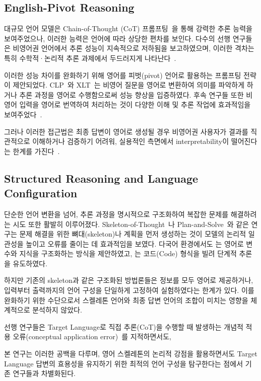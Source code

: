 \subsection{English-Pivot Reasoning}
대규모 언어 모델은 Chain-of-Thought (CoT) 프롬프팅~\citep{cot-neurips2022}을 통해 강력한 추론 능력을 보여주었으나, 이러한 능력은 언어에 따라 상당한 편차를 보인다. 다수의 선행 연구들은 비영어권 언어에서 추론 성능이 지속적으로 저하됨을 보고하였으며, 이러한 격차는 특히 수학적·논리적 추론 과제에서 두드러지게 나타난다~\citep{shi2022language, mega-emnlp2023, wang2025polymath}.

이러한 성능 차이를 완화하기 위해 영어를 피벗(pivot) 언어로 활용하는 프롬프팅 전략이 제안되었다. CLP~\citep{clp-emnlp2023}와 XLT~\citep{xlt-emnlp2023}는 비영어 질문을 영어로 변환하여 의미를 파악하게 하거나 추론 과정을 영어로 수행함으로써 성능 향상을 입증하였다. 후속 연구들 또한 비영어 입력을 영어로 번역하여 처리하는 것이 다양한 이해 및 추론 작업에 효과적임을 보여주었다~\citep{trans-allneed-2025naacl}.

그러나 이러한 접근법은 최종 답변이 영어로 생성될 경우 비영어권 사용자가 결과를 직관적으로 이해하거나 검증하기 어려워, 실용적인 측면에서 interpretability이 떨어진다는 한계를 가진다~\citep{multilingual-prompting-emnlp2025}.

\subsection{Structured Reasoning and Language Configuration} 
단순한 언어 변환을 넘어, 추론 과정을 명시적으로 구조화하여 복잡한 문제를 해결하려는 시도 또한 활발히 이루어졌다. Skeleton-of-Thought~\citep{ning2023skeleton}나 Plan-and-Solve~\citep{wang2023plan}와 같은 연구는 문제 해결을 위한 뼈대(skeleton)나 계획을 먼저 생성하는 것이 모델의 논리적 일관성을 높이고 오류를 줄이는 데 효과적임을 보였다. 다국어 환경에서도 \citet{qi2025sot}는 영어로 변수와 지식을 구조화하는 방식을 제안하였고, \citet{li2024eliciting}는 코드(Code) 형식을 빌려 단계적 추론을 유도하였다.

하지만 기존의 skeleton과 같은 구조화된 방법론들은 정보를 모두 영어로 제공하거나, 입력부터 출력까지의 언어 구성을 단일하게 고정하여 실험하였다는 한계가 있다. 이를 완화하기 위한 수단으로서 스켈레톤 언어와 최종 답변 언어의 조합이 미치는 영향을 체계적으로 분석하지 않았다.

선행 연구들은 Target Language로 직접 추론(CoT)을 수행할 때 발생하는 개념적 적용 오류(conceptual application error)~\citep{long-cot-2025arxiv}를 지적하면서도, 

본 연구는 이러한 공백을 다루며, 영어 스켈레톤의 논리적 강점을 활용하면서도 Target Language 답변의 효용성을 유지하기 위한 최적의 언어 구성을 탐구한다는 점에서 기존 연구들과 차별화된다.

